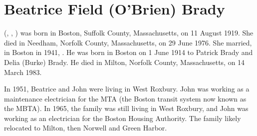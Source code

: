 \section{Beatrice Field (O'Brien) Brady}\label{per:Beatrice4OBrien}

 (, , ) was born in Boston, Suffolk County, Massachusetts, on 11 August 1919.\cite{Beatrice4OBrienBirth} She died in Needham, Norfolk County, Massachusetts, on 29 June 1976.\cite{Beatrice4OBrienDeath} She married, in Boston in 1941, .\cite{Beatrice4OBrienMarriage} He was born in Boston on 1 June 1914 to Patrick Brady and Delia (Burke) Brady.\cite{JohnBradyDraft} He died in Milton, Norfolk County, Massachusetts, on 14 March 1983.\cite{JohnBradyDeath}

In 1951, Beatrice and John were living in West Roxbury. John was working as a maintenance electrician for the MTA (the Boston transit system now known as the MBTA).\cite{JohnBrady1951} In 1965, the family was still living in West Roxbury, and John was working as an electrician for the Boston Housing Authority.\cite{JohnBrady1965} The family likely relocated to Milton, then Norwell and Green Harbor.\cite{Beatrice4OBrienObit}



